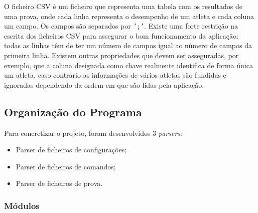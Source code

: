\documentclass[11pt, a4paper, oneside]{article}
\begin{document}
O ficheiro CSV é um ficheiro que representa uma tabela com os resultados de uma prova, onde cada linha representa o desempenho de um atleta e cada coluna um campo. Os campos são separados por \texttt{';'}. Existe uma forte restrição na escrita dos ficheiros CSV para assegurar o bom funcionamento da aplicação: todas as linhas têm de ter um número de campos igual ao número de campos da primeira linha. Existem outras propriedades que devem ser asseguradas, por exemplo, que a coluna designada como chave realmente identifica de forma única um atleta, caso contrário as informações de vários atletas são fundidas e ignoradas dependendo da ordem em que são lidas pela aplicação.

\newpage
\subsection{Organização do Programa}

Para concretizar o projeto, foram desenvolvidos 3 \emph{parsers}:
\begin{itemize}
\item Parser de ficheiros de configurações;
\item Parser de ficheiros de comandos;
\item Parser de ficheiros de prova.
\end{itemize}

\subsubsection{Módulos}
\end{document}
